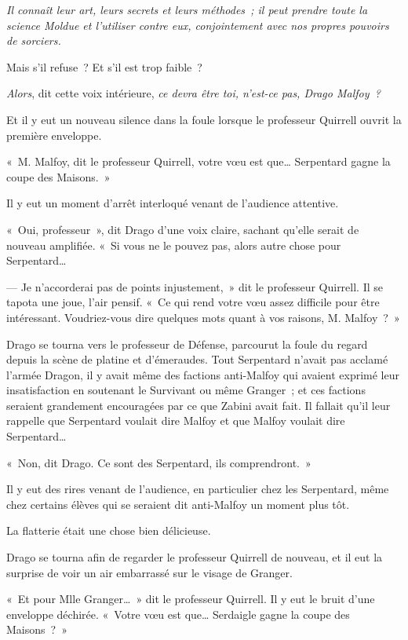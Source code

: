 \emph{Il connaît leur art, leurs secrets et leurs méthodes~; il peut prendre toute la science Moldue et l'utiliser contre eux, conjointement avec nos propres pouvoirs de sorciers.}

Mais s'il refuse~? Et s'il est trop faible~?

\emph{Alors}, dit cette voix intérieure, \emph{ce devra être toi, n'est-ce pas, Drago Malfoy~?}

Et il y eut un nouveau silence dans la foule lorsque le professeur Quirrell ouvrit la première enveloppe.

«~M. Malfoy, dit le professeur Quirrell, votre vœu est que… Serpentard gagne la coupe des Maisons.~»

Il y eut un moment d'arrêt interloqué venant de l'audience attentive.

«~Oui, professeur~», dit Drago d'une voix claire, sachant qu'elle serait de nouveau amplifiée. «~Si vous ne le pouvez pas, alors autre chose pour Serpentard…

--- Je n'accorderai pas de points injustement,~» dit le professeur Quirrell. Il se tapota une joue, l'air pensif. «~Ce qui rend votre vœu assez difficile pour être intéressant. Voudriez-vous dire quelques mots quant à vos raisons, M. Malfoy~?~»

Drago se tourna vers le professeur de Défense, parcourut la foule du regard depuis la scène de platine et d'émeraudes. Tout Serpentard n'avait pas acclamé l'armée Dragon, il y avait même des factions anti-Malfoy qui avaient exprimé leur insatisfaction en soutenant le Survivant ou même Granger~; et ces factions seraient grandement encouragées par ce que Zabini avait fait. Il fallait qu'il leur rappelle que Serpentard voulait dire Malfoy et que Malfoy voulait dire Serpentard…

«~Non, dit Drago. Ce sont des Serpentard, ils comprendront.~»

Il y eut des rires venant de l'audience, en particulier chez les Serpentard, même chez certains élèves qui se seraient dit anti-Malfoy un moment plus tôt.

La flatterie était une chose bien délicieuse.

Drago se tourna afin de regarder le professeur Quirrell de nouveau, et il eut la surprise de voir un air embarrassé sur le visage de Granger.

«~Et pour Mlle Granger…~» dit le professeur Quirrell. Il y eut le bruit d'une enveloppe déchirée. «~Votre vœu est que… Serdaigle gagne la coupe des Maisons~?~»

